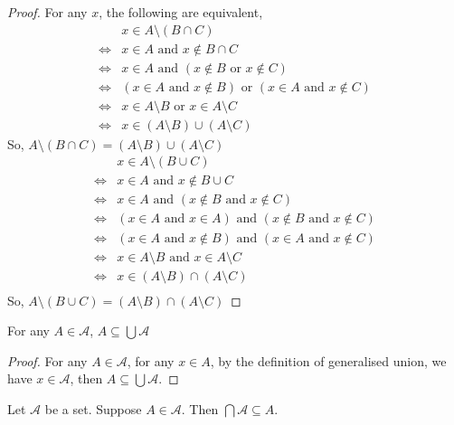\begin{proof}
    For any $x$, the following are equivalent,
    \begin{align*}
        & x\in A\setminus (B\cap C)\\
        \Leftrightarrow & x\in A \text{ and }x\not\in B\cap C\\
        \Leftrightarrow & x\in A \text{ and }(x\not\in B\text{ or }x\not\in C)\\
        \Leftrightarrow & (x\in A\text{ and }x\not\in B)\text{ or }(x\in A\text{ and }x\not\in C)\\
        \Leftrightarrow & x\in A\setminus B\text{ or }x\in A\setminus C\\
        \Leftrightarrow & x\in (A\setminus B)\cup(A\setminus C)
    \end{align*}
    So, $A\setminus(B\cap C) = (A\setminus B) \cup (A\setminus C)$\\
    \begin{align*}
        & x\in A\setminus (B\cup C)\\
        \Leftrightarrow & x\in A\text{ and }x\not\in B\cup C\\
        \Leftrightarrow & x\in A \text{ and }(x\not\in B\text{ and }x\not\in C)\\
        \Leftrightarrow & (x\in A \text{ and } x\in A)\text{ and }(x\not\in B\text{ and }x\not\in C)\\
        \Leftrightarrow & (x\in A\text{ and }x\not\in B)\text{ and }(x\in A\text{ and }x\not\in C)\\
        \Leftrightarrow & x\in A\setminus B\text{ and }x\in A\setminus C\\
        \Leftrightarrow & x\in(A\setminus B)\cap(A\setminus C)\\
    \end{align*}
    So, $A\setminus (B\cup C) = (A\setminus B)\cap (A\setminus C)$
\end{proof}
\begin{prop}
    For any $A\in\mathscr A$, $A\subseteq \bigcup\mathscr A$
\end{prop}
\begin{proof}
    For any $A\in\mathscr A$, for any $x\in A$, by the definition of generalised union, we have $x\in\mathscr A$, then $A\subseteq \bigcup \mathscr A$.
\end{proof}
\begin{prop}
    Let $\mathscr A$ be a set. Suppose $A\in\mathscr A$. Then $\bigcap\mathscr A\subseteq A$.
\end{prop}
